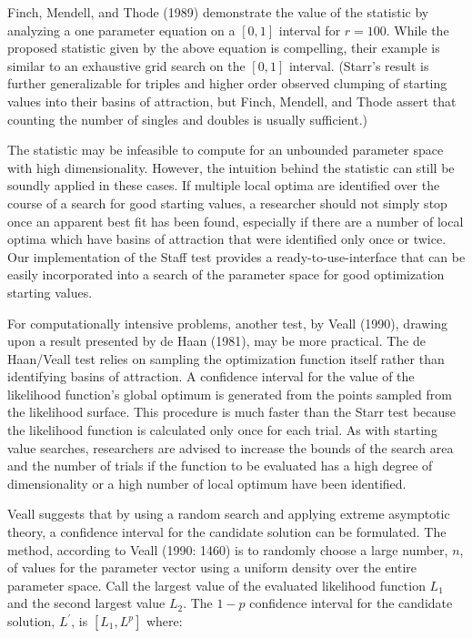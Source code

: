 \documentclass[11pt]{article}
\begin{document}
Finch, Mendell, and Thode (1989) demonstrate the value of the
statistic by analyzing a one parameter equation on a $[0,1]$
interval for $r = 100$. While the proposed statistic given by the
above equation is compelling, their example is similar to an
exhaustive grid search on the $[0,1]$ interval. 
(Starr's result is further generalizable for triples and
higher order observed clumping of starting values into their
basins of attraction, but Finch, Mendell, and Thode assert that
counting the number of singles and doubles is usually sufficient.)

The statistic may be infeasible to compute for an unbounded parameter space with 
high dimensionality. However, the intuition behind the statistic
can still  be soundly applied in these cases. If multiple local optima are identified over the
course of a search for good starting values, a researcher should
not simply stop once an apparent best fit has been found,
especially if there are a number of local optima which have basins
of attraction that were identified only once or twice. Our implementation
of the Staff test provides a ready-to-use-interface that can be 
easily incorporated into a search of the parameter space for good  optimization 
starting values.

For computationally intensive problems, another test, by Veall (1990), drawing upon a 
result presented by de Haan (1981), may be more practical. The de Haan/Veall test relies on
 sampling the optimization function itself rather than
identifying basins of attraction. A confidence interval for 
the value of the likelihood function's global optimum is generated from
the points sampled from the likelihood surface. This procedure is much faster than the Starr
test because  the likelihood function  is calculated  only once for each 
trial. As with starting value searches, researchers are
advised to increase the bounds of the search area and the number
of trials if the function to be evaluated has a high degree of
dimensionality or a high number of local optimum have been
identified.

Veall suggests that by using a random search and applying extreme asymptotic theory, a confidence interval for the candidate
solution can be formulated. The method, according to Veall (1990:
1460) is to randomly choose a large number, $n$, of values for the
parameter vector using a uniform density over the entire parameter
space. Call the largest value of the evaluated likelihood function
$L_1$ and the second largest value $L_2$. The $1-p$ confidence
interval for the candidate solution, $L^{'}$, is $[L_1,L^p]$
where:
\end{document}
